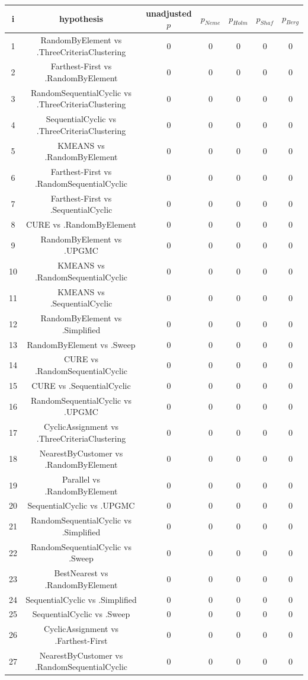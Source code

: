 \documentclass[a4paper,10pt]{article}
\begin{document}
\begin{landscape}
\begin{table}[!htp]
\centering\scriptsize
\begin{tabular}{ccccccc}
i&hypothesis&unadjusted $p$&$p_{Neme}$&$p_{Holm}$&$p_{Shaf}$&$p_{Berg}$\\
\hline1&RandomByElement vs .ThreeCriteriaClustering&0&0&0&0&0\\
2&Farthest-First vs .RandomByElement&0&0&0&0&0\\
3&RandomSequentialCyclic vs .ThreeCriteriaClustering&0&0&0&0&0\\
4&SequentialCyclic vs .ThreeCriteriaClustering&0&0&0&0&0\\
5&KMEANS vs .RandomByElement&0&0&0&0&0\\
6&Farthest-First vs .RandomSequentialCyclic&0&0&0&0&0\\
7&Farthest-First vs .SequentialCyclic&0&0&0&0&0\\
8&CURE vs .RandomByElement&0&0&0&0&0\\
9&RandomByElement vs .UPGMC&0&0&0&0&0\\
10&KMEANS vs .RandomSequentialCyclic&0&0&0&0&0\\
11&KMEANS vs .SequentialCyclic&0&0&0&0&0\\
12&RandomByElement vs .Simplified&0&0&0&0&0\\
13&RandomByElement vs .Sweep&0&0&0&0&0\\
14&CURE vs .RandomSequentialCyclic&0&0&0&0&0\\
15&CURE vs .SequentialCyclic&0&0&0&0&0\\
16&RandomSequentialCyclic vs .UPGMC&0&0&0&0&0\\
17&CyclicAssignment vs .ThreeCriteriaClustering&0&0&0&0&0\\
18&NearestByCustomer vs .RandomByElement&0&0&0&0&0\\
19&Parallel vs .RandomByElement&0&0&0&0&0\\
20&SequentialCyclic vs .UPGMC&0&0&0&0&0\\
21&RandomSequentialCyclic vs .Simplified&0&0&0&0&0\\
22&RandomSequentialCyclic vs .Sweep&0&0&0&0&0\\
23&BestNearest vs .RandomByElement&0&0&0&0&0\\
24&SequentialCyclic vs .Simplified&0&0&0&0&0\\
25&SequentialCyclic vs .Sweep&0&0&0&0&0\\
26&CyclicAssignment vs .Farthest-First&0&0&0&0&0\\
27&NearestByCustomer vs .RandomSequentialCyclic&0&0&0&0&0\\

\end{tabular}
\end{table}
\end{landscape}
\end{document}
